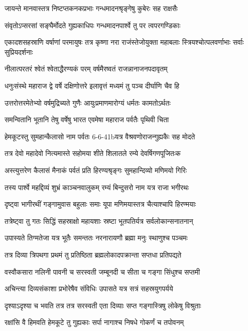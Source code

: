 \twolineshloka
{जायन्ते मानवास्तत्र निष्टप्तकनकप्रभाः}
{गन्धमादनश्रृङ्गेषु कुबेरः सह राक्षसैः}


\twolineshloka
{संवृतोऽप्सरसां सङ्घैर्मोदते गुह्यकाधिपः}
{गन्धमादनपार्श्वे तु पर त्वपरगण्डिकाः}


\threelineshloka
{एकादशसहस्राणि वर्षाणां परमायुषः}
{तत्र कृष्णा नरा राजंस्तेजोयुक्ता महाबलाः}
{स्त्रियश्चोत्पलवर्णाभाः सर्वाः सुप्रियदर्शनाः}


\twolineshloka
{नीलात्परतरं श्वेतं श्वेताद्धैरण्यकं परम्}
{वर्षमैरष्वतं राजन्नानाजनपदावृतम्}


\twolineshloka
{धनुःसंस्थे महाराज द्वे वर्षे दक्षिणोत्तरे}
{इलावृत्तं मध्यमं तु पञ्च दीर्घाणि चैव हि}


\twolineshloka
{उत्तरोत्तरमेतेभ्यो वर्षमुद्रिच्यते गुणैः}
{आयुःप्रमाणमारोग्यं धर्मतः कामतोऽर्थतः}


\twolineshloka
{समन्वितानि भूतानि तेषु वर्षेषु भारत}
{एवमेषा महाराज पर्वतैः पृथिवी चिता}


\twolineshloka
{हेमकूटस्तु सुमहान्कैलासो नाम पर्वतः}
{6-6-41bयत्र वैश्रवणोराजन्गुह्यकैः सह मोदते}


\twolineshloka
{तत्र देवो महादेवो नित्यमास्ते सहोमया}
{शीते शिलातले रम्ये देवर्षिगणपूजितःक}


\twolineshloka
{अस्त्युत्तरेण कैलासं मैनाकं पर्वतं प्रति}
{हिरण्यश्रृङ्गः सुमहान्दिव्यो मणिमयो गिरिः}


\twolineshloka
{तस्य पार्श्वे महद्दिव्यं शुभ्रं काञ्चनवालुकम्}
{रम्यं बिन्दुसरो नाम यत्र राजा भगीरथः}


\twolineshloka
{दृष्ट्वा भागीरथीं गङ्गामुवास बहुलाः समाः}
{यूपा मणिमयास्तत्र चैत्याश्चापि हिरण्मयाः}


\twolineshloka
{तत्रेष्ट्वा तु गतः सिद्धिं सहस्राक्षो महायशाः}
{स्रष्टा भूतपतिर्यत्र सर्वलोकान्सनातनान्}


\twolineshloka
{उपास्यते तिग्मतेजा यत्र भूतैः समन्ततः}
{नरनारायणौ ब्रह्मा मनुः स्थाणुश्च पञ्चमः}


\twolineshloka
{तत्र दिव्या त्रिपथगा प्रथमं तु प्रतिष्ठिता}
{ब्रह्मलोकादपक्रान्ता सप्तधा प्रतिपद्यते}


\twolineshloka
{वस्वौकसारा नलिनी पावनी च सरस्वती}
{जम्बूनदी च सीता च गङ्गा सिंधुश्च सप्तमी}


\twolineshloka
{अचिन्त्या दिव्यसंकाशा प्रभोरेषैव संविधिः}
{उपासते यत्र सत्रं सहस्रयुगपर्यये}


\twolineshloka
{दृश्याऽदृश्या च भवति तत्र तत्र सरस्वती}
{एता दिव्याः सप्त गङ्गास्त्रिषु लोकेषु विश्रुताः}


\twolineshloka
{रक्षांसि वै हिमवति हेमकूटे तु गुह्यकाः}
{सर्पा नागाश्च निषधे गोकर्णं च तपोवनम्}


